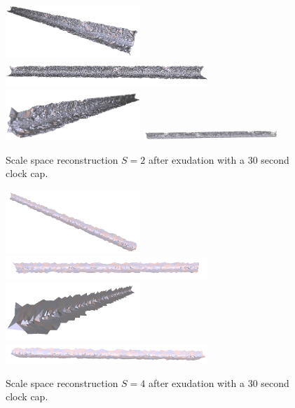 \documentclass[12pt]{drexelthesis}
\begin{document}
\begin{figure}[!ht]
	\centering
		\includegraphics[width=2in]{simulated-lab-scan/0noise/optimized/scalespace2everything00.png}
		\includegraphics[width=3in]{simulated-lab-scan/0noise/optimized/scalespace2everything01.png}
		\includegraphics[width=2in]{simulated-lab-scan/0noise/optimized/scalespace2everything02.png}
		\includegraphics[width=2in]{simulated-lab-scan/0noise/optimized/scalespace2everything03.png}
		\caption[Scale space reconstruction $S = 2$ after exudation with a 30 second clock cap]{\centering Scale space reconstruction $S = 2$ after exudation with a 30 second clock cap.}
	\label{zeronoise:scalespace2everything}
\end{figure}



\begin{figure}[!ht]
	\centering
		\includegraphics[width=2in]{simulated-lab-scan/0noise/optimized/scalespace4everything00.png}
		\includegraphics[width=3in]{simulated-lab-scan/0noise/optimized/scalespace4everything01.png}
		\includegraphics[width=2in]{simulated-lab-scan/0noise/optimized/scalespace4everything02.png}
		\includegraphics[width=3in]{simulated-lab-scan/0noise/optimized/scalespace4everything03.png}
		\caption[Scale space reconstruction $S = 4$ after exudation with a 30 second clock cap]{\centering Scale space reconstruction $S = 4$ after exudation with a 30 second clock cap.}
	\label{zeronoise:scalespace4everything}
\end{figure}
\end{document}
